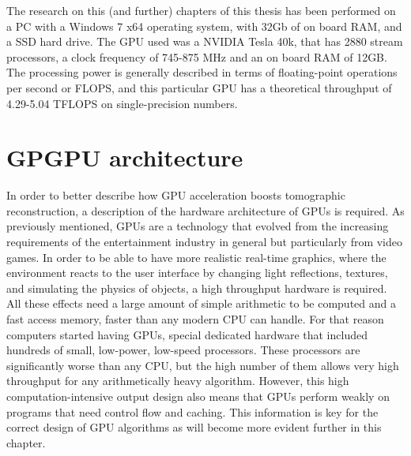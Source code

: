 The research on this (and further) chapters of this thesis has been performed on a PC with a Windows 7 x64 operating system, with 32Gb of on board RAM, and a SSD hard drive. The GPU used was a NVIDIA Tesla 40k, that has 2880 stream processors, a clock frequency of 745-875 MHz and an on board RAM of 12GB. The processing power is generally described in terms of floating-point operations per second or FLOPS, and this particular GPU has a theoretical throughput of 4.29-5.04 TFLOPS on single-precision numbers.

\section{GPGPU architecture}

In order to better describe how GPU acceleration boosts tomographic reconstruction, a description of the hardware architecture of GPUs is required. As previously mentioned, GPUs are a technology that evolved from the increasing requirements of the entertainment industry in general but particularly from video games. In order to be able to have more realistic real-time graphics, where the environment reacts to the user interface by changing light reflections, textures, and simulating the physics of objects, a high throughput hardware is required. All these effects need a large amount of simple arithmetic to be computed and a fast access memory, faster than any modern CPU can handle. For that reason computers started having GPUs, special dedicated hardware that included hundreds of small, low-power, low-speed processors. These processors are significantly worse than any CPU, but the high number of them allows very high throughput for any arithmetically heavy algorithm. However, this high computation-intensive output design also means that GPUs perform weakly on programs that need control flow and caching. This information is key for the correct design of GPU algorithms as will become more evident further in this chapter.

